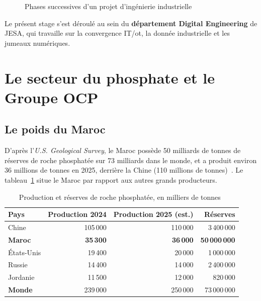 \begin{figure}[H]
\centering
{}
\caption{Phases successives d'un projet d'ingénierie industrielle}
\label{fig:stagegate}
\end{figure}

Le présent stage s'est déroulé au sein du \textbf{département Digital Engineering} de JESA, qui travaille sur la convergence IT/\gls{ot}, la donnée industrielle et les jumeaux numériques.

\section{Le secteur du phosphate et le Groupe OCP}

\subsection{Le poids du Maroc}
D'après l'\textit{U.S. Geological Survey}, le Maroc possède 50 milliards de tonnes de réserves de roche phosphatée sur 73 milliards dans le monde, et a produit environ 36 millions de tonnes en 2025, derrière la Chine (110 millions de tonnes)~\cite{usgs2026}. Le tableau~\ref{tab:usgs} situe le Maroc par rapport aux autres grands producteurs.

\begin{table}[H]
\centering
\caption{Production et réserves de roche phosphatée, en milliers de tonnes~\cite{usgs2026}}
\label{tab:usgs}
\begin{tabular}{lrrr}
\toprule
\textbf{Pays} & \textbf{Production 2024} & \textbf{Production 2025 (est.)} & \textbf{Réserves} \\
\midrule
Chine & 105\,000 & 110\,000 & 3\,400\,000 \\
\rowcolor{bleuclair}\textbf{Maroc} & \textbf{35\,300} & \textbf{36\,000} & \textbf{50\,000\,000} \\
États-Unis & 19\,400 & 20\,000 & 1\,000\,000 \\
Russie & 14\,400 & 14\,000 & 2\,400\,000 \\
Jordanie & 11\,500 & 12\,000 & 820\,000 \\
\midrule
\textbf{Monde} & 239\,000 & 250\,000 & 73\,000\,000 \\
\bottomrule
\end{tabular}
\end{table}

